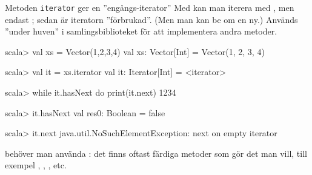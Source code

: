 \begin{Slide}{Metoden \texttt{iterator} ger en ''engångs-iterator''}\SlideFontSmall
Med  kan man iterera med , men endast ; sedan är iteratorn ''förbrukad''. (Men man kan be om en ny.) Används ''under huven'' i samlingsbiblioteket för att implementera andra metoder.
\begin{REPL}
scala> val xs = Vector(1,2,3,4)
val xs: Vector[Int] = Vector(1, 2, 3, 4)

scala> val it = xs.iterator
val it: Iterator[Int] = <iterator>

scala> while it.hasNext do print(it.next)
1234

scala> it.hasNext
val res0: Boolean = false

scala> it.next
java.util.NoSuchElementException: next on empty iterator
\end{REPL}
 behöver man  använda : det finns oftast färdiga metoder som gör det man vill, till exempel , , ,  etc.
\end{Slide}







